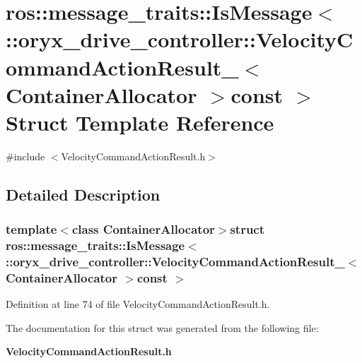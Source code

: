\section{ros\-:\-:message\-\_\-traits\-:\-:\-Is\-Message$<$ \-:\-:oryx\-\_\-drive\-\_\-controller\-:\-:\-Velocity\-Command\-Action\-Result\-\_\-$<$ \-Container\-Allocator $>$const $>$ \-Struct \-Template \-Reference}
\label{structros_1_1message__traits_1_1IsMessage_3_01_1_1oryx__drive__controller_1_1VelocityCommandActi4b42b2530f2ad4b293eb1418b1e0028d}


{\ttfamily \#include $<$\-Velocity\-Command\-Action\-Result.\-h$>$}



\subsection{\-Detailed \-Description}
\subsubsection*{template$<$class Container\-Allocator$>$struct ros\-::message\-\_\-traits\-::\-Is\-Message$<$ \-::oryx\-\_\-drive\-\_\-controller\-::\-Velocity\-Command\-Action\-Result\-\_\-$<$ Container\-Allocator $>$const  $>$}



\-Definition at line 74 of file \-Velocity\-Command\-Action\-Result.\-h.



\-The documentation for this struct was generated from the following file\-:\begin{DoxyCompactItemize}
\item 
{\bf \-Velocity\-Command\-Action\-Result.\-h}\end{DoxyCompactItemize}

